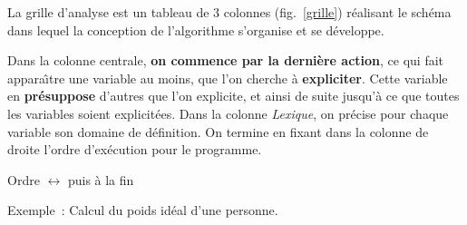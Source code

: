 La grille d'analyse est un tableau de 3 colonnes (fig.~\ref{grille})
r\'ealisant le sch\'ema dans lequel la conception de l'algorithme
s'organise et se d\'eveloppe.

Dans la colonne centrale, {\bf on commence par la derni\`ere action}, ce qui
fait appara\^\i tre une variable au moins, que l'on cherche \`a {\bf expliciter}.
Cette variable en
{\bf pr\'esuppose} d'autres que l'on explicite, et ainsi de suite jusqu'\`a ce que
toutes les variables soient explicit\'ees. Dans la colonne {\it Lexique}, on
pr\'ecise pour chaque variable son domaine de d\'efinition. On termine en fixant
dans la colonne de droite l'ordre d'ex\'ecution pour le programme.

Ordre  $\longleftrightarrow$  puis \`a la fin 

Exemple~: Calcul du poids id\'eal d'une personne.

